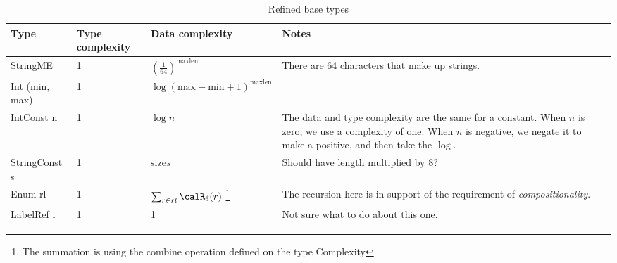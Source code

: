 \begin{longtable}{||l|l|l|l|}
\caption[Refined base types]{Refined base types}
\label{tab:v2RefinedBase}
\\\hline
\hline
Type & Type complexity & Data complexity & Notes \\\hline\hline

\textsf{StringME} & 1 & $\left(\frac{1}{64}\right)^\mathrm{maxlen}$ &
\parbox[t]{5cm}{
There are 64 characters that make up strings.
\vspace{0.5mm}} \\\hline

\textsf{Int (min, max)} & 1 & $\log (\mathrm{max}- \mathrm{min}+1)^\mathrm{maxlen}$ &
\parbox[t]{5cm}{
\vspace{0.5mm}} \\\hline

\textsf{IntConst n} & 1 & $\log n$ &
\parbox[t]{5cm}{
The data and type complexity are the same for a constant.
When $n$ is zero, we use a complexity of one.
When $n$ is negative, we negate it to make a positive, and then take the $\log$.
\vspace{0.5mm}} \\\hline

\textsf{StringConst s} & 1 & $\mathrm{size} s$ &
\parbox[t]{5cm}{
Should have length multiplied by 8?
\vspace{0.5mm}} \\\hline

\textsf{Enum rl} & 1 & $\sum_{r\in rl} \calR_\delta (r)$
\footnote{The summation is using the \textsf{combine} operation
defined on the type \textsf{Complexity}} &
\parbox[t]{5cm}{
The recursion here is in support of the requirement of
\textit{compositionality}.
\vspace{0.5mm}} \\\hline

\textsf{LabelRef i} & 1 & 1 &
\parbox[t]{5cm}{
Not sure what to do about this one.
\vspace{0.5mm}} \\\hline

\end{longtable}

